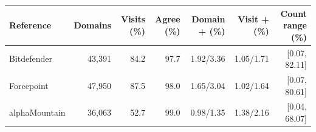 \begin{tabular}{lrrrrrr}
\toprule
Reference & Domains & Visits (\%) & Agree (\%) & Domain + (\%) & Visit + (\%) & Count range (\%) \\
\midrule
Bitdefender & 43,391 & 84.2 & 97.7 & 1.92/3.36 & 1.05/1.71 & [0.07, 82.11] \\
Forcepoint & 47,950 & 87.5 & 98.0 & 1.65/3.04 & 1.02/1.64 & [0.07, 80.61] \\
alphaMountain & 36,063 & 52.7 & 99.0 & 0.98/1.35 & 1.38/2.16 & [0.04, 68.07] \\
\bottomrule
\end{tabular}
